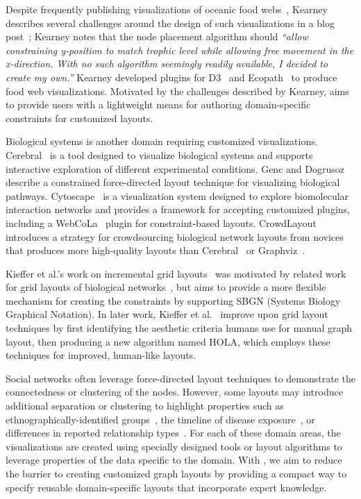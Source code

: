 Despite frequently publishing visualizations of oceanic food 
webs~\cite{kearney2012coupling,kearney2013amplification},
Kearney describes several challenges around the design of such visualizations
in a blog post~\cite{kearney2016blog}; Kearney notes that the node
placement algorithm should \emph{``allow constraining y-position to match
  trophic level while allowing free movement in the x-direction. With no
  such algorithm seemingly readily available, I decided to create my
  own.''} Kearney developed plugins for D3~\cite{kearney2017d3} and
Ecopath~\cite{kearney2017ecopath} to produce food web visualizations. 
Motivated by the challenges described by Kearney, \projectname aims to provide users
with a lightweight means for authoring domain-specific constraints for customized layouts.

Biological systems is another domain requiring customized visualizations.
Cerebral~\cite{barsky2008cerebral} is a tool designed to visualize
biological systems and supports interactive exploration of different
experimental conditions. Genc and Dogrusoz~\cite{genc2003constrained}
describe a constrained force-directed layout technique for visualizing 
biological pathways. Cytoscape~\cite{shannon2003cytoscape} is a
visualization system designed to explore biomolecular interaction networks
and provides a framework for accepting customized plugins, including 
a WebCoLa~\cite{WebCoLa} plugin for constraint-based layouts.
CrowdLayout~\cite{singh2018crowdlayout} introduces a strategy for crowdsourcing 
biological network layouts from novices that produces more high-quality
layouts than Cerebral~\cite{barsky2008cerebral} or Graphviz~\cite{ellson2001graphviz}.

Kieffer et al.'s work on incremental grid layouts~\cite{kieffer2013incremental}
was motivated by related work for grid layouts of biological 
networks~\cite{barsky2008cerebral,kojima2007efficient,li2005grid}, 
but aims to provide a more flexible mechanism for creating the constraints 
by supporting SBGN (Systems Biology Graphical Notation). In later
work, Kieffer et al.~\cite{kieffer2016hola} improve upon grid layout techniques
by first identifying the aesthetic criteria humans use for manual graph layout,
then producing a new algorithm named HOLA, which employs these techniques for improved,
human-like layouts.

Social networks often leverage force-directed layout techniques
to demonstrate the connectedness or clustering of the nodes. However, some
layouts may introduce additional separation or clustering
to highlight properties such as ethnographically-identified groups~\cite{rothenberg1998using},
the timeline of disease
exposure~\cite{fitzpatrick2001preventable,mcelroy2003network},
or differences in reported relationship types~\cite{fu2011hiv}.
For each of these domain areas, the visualizations are created using specially
designed tools or layout algorithms to leverage properties of the data
specific to the domain. With \projectname, we aim to reduce the barrier to
creating customized graph layouts by providing a compact way to specify
reusable domain-specific layouts that incorporate expert knowledge.


